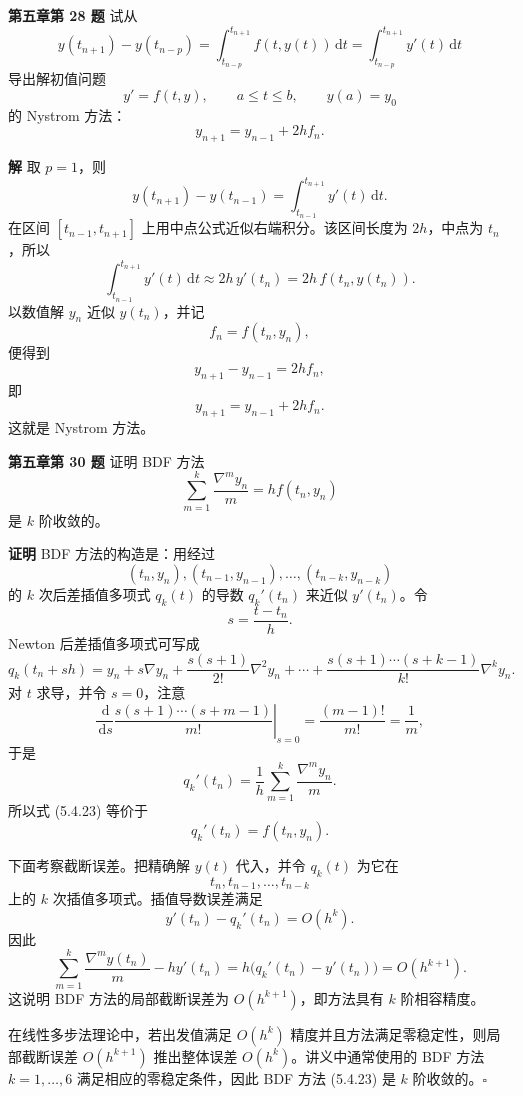 \documentclass[UTF8,a4paper,11pt]{ctexart}
\newcommand{\dd}{\,\mathrm{d}}
\newcommand{\QED}{\hfill$\square$}
\begin{document}
\bigskip\bigskip

\noindent\textbf{第五章\quad 第 28 题}\quad
试从
\[
  y(t_{n+1})-y(t_{n-p})
  =\int_{t_{n-p}}^{t_{n+1}} f(t,y(t))\dd t
  =\int_{t_{n-p}}^{t_{n+1}} y'(t)\dd t
\]
导出解初值问题
\[
  y'=f(t,y),\qquad a\le t\le b,\qquad y(a)=y_0
\]
的 Nystrom 方法：
\[
  y_{n+1}=y_{n-1}+2hf_n.
\]

\medskip
\noindent\textbf{解}\quad
取 \(p=1\)，则
\[
  y(t_{n+1})-y(t_{n-1})
  =\int_{t_{n-1}}^{t_{n+1}} y'(t)\dd t.
\]
在区间 \([t_{n-1},t_{n+1}]\) 上用中点公式近似右端积分。该区间长度为 \(2h\)，中点为 \(t_n\)，所以
\[
  \int_{t_{n-1}}^{t_{n+1}} y'(t)\dd t
  \approx 2h\,y'(t_n)
  =2h\,f(t_n,y(t_n)).
\]
以数值解 \(y_n\) 近似 \(y(t_n)\)，并记
\[
  f_n=f(t_n,y_n),
\]
便得到
\[
  y_{n+1}-y_{n-1}=2h f_n,
\]
即
\[
  \boxed{y_{n+1}=y_{n-1}+2h f_n.}
\]
这就是 Nystrom 方法。

\bigskip\bigskip

\noindent\textbf{第五章\quad 第 30 题}\quad
证明 BDF 方法
\[
  \sum_{m=1}^{k}\frac{\nabla^m y_n}{m}=h f(t_n,y_n)
  \tag{5.4.23}
\]
是 \(k\) 阶收敛的。

\medskip
\noindent\textbf{证明}\quad
BDF 方法的构造是：用经过
\[
  (t_n,y_n),(t_{n-1},y_{n-1}),\ldots,(t_{n-k},y_{n-k})
\]
的 \(k\) 次后差插值多项式 \(q_k(t)\) 的导数 \(q_k'(t_n)\) 来近似 \(y'(t_n)\)。令
\[
  s=\frac{t-t_n}{h}.
\]
Newton 后差插值多项式可写成
\[
  q_k(t_n+sh)
  =y_n+s\nabla y_n+\frac{s(s+1)}{2!}\nabla^2y_n
  +\cdots+
  \frac{s(s+1)\cdots(s+k-1)}{k!}\nabla^k y_n.
\]
对 \(t\) 求导，并令 \(s=0\)，注意
\[
  \left.\frac{\dd}{\dd s}
  \frac{s(s+1)\cdots(s+m-1)}{m!}\right|_{s=0}
  =\frac{(m-1)!}{m!}=\frac1m,
\]
于是
\[
  q_k'(t_n)
  =\frac1h\sum_{m=1}^{k}\frac{\nabla^m y_n}{m}.
\]
所以式 (5.4.23) 等价于
\[
  q_k'(t_n)=f(t_n,y_n).
\]

下面考察截断误差。把精确解 \(y(t)\) 代入，并令 \(q_k(t)\) 为它在
\[
  t_n,t_{n-1},\ldots,t_{n-k}
\]
上的 \(k\) 次插值多项式。插值导数误差满足
\[
  y'(t_n)-q_k'(t_n)=O(h^k).
\]
因此
\[
  \sum_{m=1}^{k}\frac{\nabla^m y(t_n)}{m}
  -h y'(t_n)
  =h\bigl(q_k'(t_n)-y'(t_n)\bigr)
  =O(h^{k+1}).
\]
这说明 BDF 方法的局部截断误差为 \(O(h^{k+1})\)，即方法具有 \(k\) 阶相容精度。

在线性多步法理论中，若出发值满足 \(O(h^k)\) 精度并且方法满足零稳定性，则局部截断误差 \(O(h^{k+1})\) 推出整体误差 \(O(h^k)\)。讲义中通常使用的 BDF 方法 \(k=1,\ldots,6\) 满足相应的零稳定条件，因此 BDF 方法 (5.4.23) 是 \(k\) 阶收敛的。\QED
\end{document}
